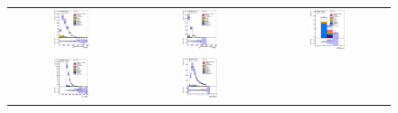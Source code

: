 \clearpage
\begin{figure}[htbp]
\begin{center}
\begin{tabular}{ccc}
%
\includegraphics[width=0.30\textwidth]{appendices/figures/sdrs/JetPtB1_ELEMUONCR5_1W_NOMINAL.eps}  &
\includegraphics[width=0.30\textwidth]{appendices/figures/sdrs/JetPtB2_ELEMUONCR5_1W_NOMINAL.eps} &
\includegraphics[width=0.30\textwidth]{appendices/figures/sdrs/nWhad_ELEMUONCR5_1W_NOMINAL_logscale.eps} \\
\includegraphics[width=0.30\textwidth]{appendices/figures/sdrs/VLQAna_WbX_W1Pt_ELEMUONCR5_1W_NOMINAL.eps} &
\includegraphics[width=0.30\textwidth]{appendices/figures/sdrs/VLQAna_WbX_DRLepMet_ELEMUONCR5_1W_NOMINAL.eps} &

\end{tabular}
\end{center}
\end{figure}
